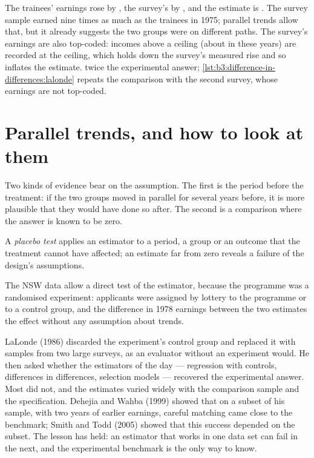 \label{out:b3:difference-in-differences:nsw}

The trainees' earnings rose by , the survey's by , and the
estimate is . %
The survey sample earned nine times as much as the trainees in 1975; parallel
trends allow that, but it already suggests the two groups were on different
paths. The survey's earnings are also top-coded: incomes above a ceiling (about
 in these years) are recorded at the ceiling, which holds down the
survey's measured rise and so inflates the estimate.
twice the experimental answer; \cref{lst:b3:difference-in-differences:lalonde}
repeats the comparison with the second survey, whose earnings are not top-coded.

\section{Parallel trends, and how to look at them}\label{sec:b3:difference-in-differences:parallel}

Two kinds of evidence bear on the assumption. The first is the period before
the treatment: if the two groups moved in parallel for several years before,
it is more plausible that they would have done so after. The second is a
comparison where the answer is known to be zero.

\begin{definition}\label{def:b3:difference-in-differences:placebo}
A \emph{placebo test} applies an estimator to a period, a group or an outcome
that the treatment cannot have affected; an estimate far from zero reveals a
failure of the design's assumptions.
\end{definition}

The NSW data allow a direct test of the estimator, because the programme was a
randomised experiment: applicants were assigned by lottery to the programme or
to a control group, and the difference in 1978 earnings between the two
estimates the effect without any assumption about trends.

\begin{record}
LaLonde (1986) discarded the experiment's control group and replaced it with
samples from two large surveys, as an evaluator without an experiment would.
He then asked whether the estimators of the day --- regression with controls,
differences in differences, selection models --- recovered the experimental
answer. Most did not, and the estimates varied widely with the comparison
sample and the specification. Dehejia and Wahba (1999) showed that on a subset
of his sample, with two years of earlier earnings, careful matching came close
to the benchmark; Smith and Todd (2005) showed that this success depended on
the subset. The lesson has held: an estimator that works in one data set can
fail in the next, and the experimental benchmark is the only way to know.
\end{record}

